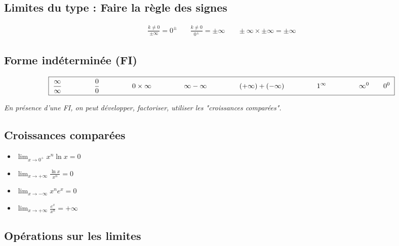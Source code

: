 \documentclass[12]{article}%
\theoremstyle{plain}
\theoremstyle{definition}
\theoremstyle{remark}
\begin{document}
\subsection{Limites du type : \textbf{Faire la règle des signes}}

\[
\boxed{
	\begin{array}{ccc}
		\displaystyle \frac{k \ne 0}{\pm\infty} = 0^\pm &
		\quad \displaystyle \frac{k \ne 0}{0^\pm} = \pm\infty &
		\quad \displaystyle \pm \infty \times \pm \infty = \pm \infty
	\end{array}
}
\]

\subsection{Forme indéterminée (FI)}

\[
\boxed{
	\begin{array}{@{\hskip 3pt} c @{\hskip 6pt} c @{\hskip 6pt} c @{\hskip 6pt} c @{\hskip 6pt} c @{\hskip 6pt} c @{\hskip 6pt} c @{\hskip 3pt}}
		\displaystyle \frac{\infty}{\infty}  \qquad \qquad &
		\displaystyle \frac{0}{0}  \qquad \qquad &
		\displaystyle 0 \times \infty \qquad \qquad &
		\displaystyle \infty - \infty \qquad \qquad &
		\displaystyle (+\infty) + (-\infty) \qquad \qquad &
		\displaystyle 1^\infty \qquad \qquad &
		\displaystyle \infty^0 \qquad 0^0
	\end{array}
}
\]


\textit{En présence d’une FI, on peut développer, factoriser, utiliser les "croissances comparées".}

\subsection{Croissances comparées}

\begin{itemize}
	\item \( \displaystyle \lim_{x \to 0^+} x^n \ln x = 0 \)
	\item \( \displaystyle \lim_{x \to +\infty} \frac{\ln x}{x^n} = 0 \)
	\item \( \displaystyle \lim_{x \to -\infty} x^n e^x = 0 \)
	\item \( \displaystyle \lim_{x \to +\infty} \frac{e^x}{x^n} = +\infty \)
\end{itemize}

\subsection{Opérations sur les limites}
\end{document}
